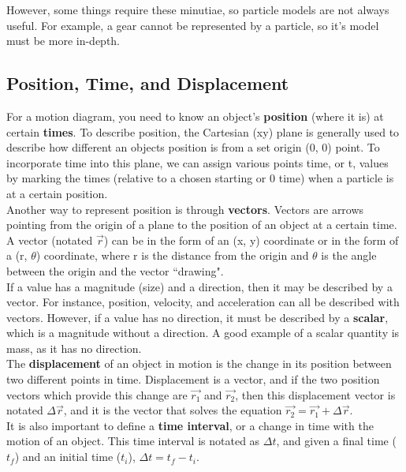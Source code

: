 \documentclass[12pt,letterpaper]{article}
\begin{document}
However, some things require these minutiae, so particle models are not always useful. For example, a gear cannot be represented by a particle, so it's model must be more in-depth.

\subsection[Position, Time, and Displacement]{Position, Time, and Displacement}

For a motion diagram, you need to know an object's \textbf{position} (where it is) at certain \textbf{times}. To describe position, the Cartesian (xy) plane is generally used to describe how different an objects position is from a set origin (0, 0) point. To incorporate time into this plane, we can assign various points time, or t, values by marking the times (relative to a chosen starting or 0 time) when a particle is at a certain position. \\

Another way to represent position is through \textbf{vectors}. Vectors are arrows pointing from the origin of a plane to the position of an object at a certain time. A vector (notated $\vec{r}$) can be in the form of an (x, y) coordinate or in the form of a (r, $\theta$) coordinate, where r is the distance from the origin and $\theta$ is the angle between the origin and the vector ``drawing". \\

If a value has a magnitude (size) and a direction, then it may be described by a vector. For instance, position, velocity, and acceleration can all be described with vectors. However, if a value has no direction, it must be described by a \textbf{scalar}, which is a magnitude without a direction. A good example of a scalar quantity is mass, as it has no direction. \\

The \textbf{displacement} of an object in motion is the change in its position between two different points in time. Displacement is a vector, and if the two  position vectors which provide this change are $\vec{r_{1}}$ and $\vec{r_{2}}$, then this displacement vector is notated $\Delta\vec{r}$, and it is the vector that solves the equation $\vec{r_{2}} = \vec{r_{1}} + \Delta\vec{r}$. \\

It is also important to define a \textbf{time interval}, or a change in time with the motion of an object. This time interval is notated as $\Delta t$, and given a final time ($t_{f}$) and an initial time ($t_{i}$), $\Delta t=t_{f}-t_{i}$.
\end{document}
